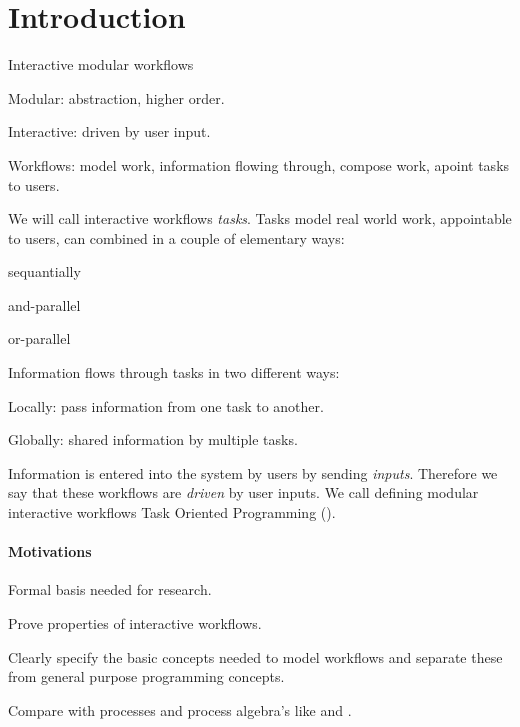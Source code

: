 


\section{Introduction}


Interactive modular workflows
\begin{itemize*}
  \item Modular: abstraction, higher order.
  \item Interactive: driven by user input.
  \item Workflows: model work, information flowing through, compose work, apoint tasks to users.
\end{itemize*}

We will call interactive workflows \emph{tasks}.
Tasks model real world work, appointable to users,
can combined in a couple of elementary ways:
\begin{itemize*}
  \item sequantially
  \item and-parallel
  \item or-parallel
\end{itemize*}
Information flows through tasks in two different ways:
\begin{enumerate*}
  \item Locally: pass information from one task to another.
  \item Globally: shared information by multiple tasks.
\end{enumerate*}
Information is entered into the system by users by sending \emph{inputs}.
Therefore we say that these workflows are \emph{driven} by user inputs.
We call defining modular interactive workflows Task Oriented Programming (\TOP).


\paragraph{Motivations}
\begin{itemize*}
  \item Formal basis needed for research.
  \item Prove properties of interactive workflows.
  \item Clearly specify the basic concepts needed to model workflows
    and separate these from general purpose programming concepts.
  \item Compare \TOP with processes and process algebra's like \CSP and \CCS.
\end{itemize*}


